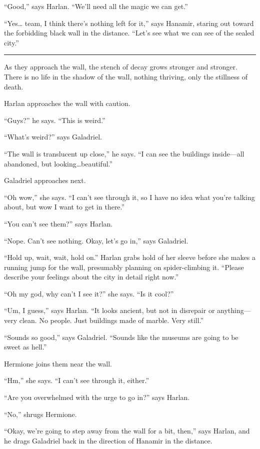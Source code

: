 \documentclass[smalldemyvopaper,11pt,twoside,onecolumn,openright,extrafontsizes]{memoir}
\begin{document}
``Good,'' says Harlan. ``We'll need all the magic we can get.''

``Yes\ldots{} team, I think there's nothing left for it,'' says Hanamir,
staring out toward the forbidding black wall in the distance. ``Let's
see what we can see of the sealed city.''

\begin{center}\rule{0.5\linewidth}{\linethickness}\end{center}

As they approach the wall, the stench of decay grows stronger and
stronger. There is no life in the shadow of the wall, nothing thriving,
only the stillness of death.

Harlan approaches the wall with caution.

``Guys?'' he says. ``This is weird.''

``What's weird?'' says Galadriel.

``The wall is translucent up close,'' he says. ``I can see the buildings
inside---all abandoned, but looking\ldots beautiful.''

Galadriel approaches next.

``Oh wow,'' she says. ``I can't see through it, so I have no idea what
you're talking about, but wow I want to get in there.''

``You can't see them?'' says Harlan.

``Nope. Can't see nothing. Okay, let's go in,'' says Galadriel.

``Hold up, wait, wait, hold on.'' Harlan grabs hold of her sleeve before
she makes a running jump for the wall, presumably planning on
spider-climbing it. ``Please describe your feelings about the city in
detail right now.''

``Oh my god, why can't I see it?'' she says. ``Is it cool?''

``Um, I guess,'' says Harlan. ``It looks ancient, but not in disrepair
or anything---very clean. No people. Just buildings made of marble. Very
still.''

``Sounds so good,'' says Galadriel. ``Sounds like the museums are going
to be sweet as hell.''

Hermione joins them near the wall.

``Hm,'' she says. ``I can't see through it, either.''

``Are you overwhelmed with the urge to go in?'' says Harlan.

``No,'' shrugs Hermione.

``Okay, we're going to step away from the wall for a bit, then,'' says
Harlan, and he drags Galadriel back in the direction of Hanamir in the
distance.
\end{document}
